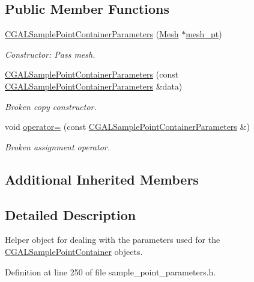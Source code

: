 \subsection*{Public Member Functions}
\begin{DoxyCompactItemize}
\item 
\hyperlink{classoomph_1_1CGALSamplePointContainerParameters_ab8dea419a55474ba42a15992c479804e}{C\+G\+A\+L\+Sample\+Point\+Container\+Parameters} (\hyperlink{classoomph_1_1Mesh}{Mesh} $\ast$\hyperlink{classoomph_1_1SamplePointContainerParameters_a92bcab955d47e99d47b601253da7b6b2}{mesh\+\_\+pt})
\begin{DoxyCompactList}\small\item\em Constructor\+: Pass mesh. \end{DoxyCompactList}\item 
\hyperlink{classoomph_1_1CGALSamplePointContainerParameters_a34e7dd9df2cc7eb6edc54f9a873c9853}{C\+G\+A\+L\+Sample\+Point\+Container\+Parameters} (const \hyperlink{classoomph_1_1CGALSamplePointContainerParameters}{C\+G\+A\+L\+Sample\+Point\+Container\+Parameters} \&data)
\begin{DoxyCompactList}\small\item\em Broken copy constructor. \end{DoxyCompactList}\item 
void \hyperlink{classoomph_1_1CGALSamplePointContainerParameters_a41ed00b3d08398968b8492085cb2abb5}{operator=} (const \hyperlink{classoomph_1_1CGALSamplePointContainerParameters}{C\+G\+A\+L\+Sample\+Point\+Container\+Parameters} \&)
\begin{DoxyCompactList}\small\item\em Broken assignment operator. \end{DoxyCompactList}\end{DoxyCompactItemize}
\subsection*{Additional Inherited Members}


\subsection{Detailed Description}
Helper object for dealing with the parameters used for the \hyperlink{classCGALSamplePointContainer}{C\+G\+A\+L\+Sample\+Point\+Container} objects. 

Definition at line 250 of file sample\+\_\+point\+\_\+parameters.\+h.



